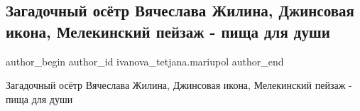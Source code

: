  
 
 
 
 

\subsection{Загадочный осётр Вячеслава Жилина,  Джинсовая икона, Мелекинский пейзаж - пища для души}
\label{sec:21_02_2021.fb.ivanova_tetjana.mariupol.1.zagadochnii_osyotr_v}

\ifcmt
 author_begin
   author_id ivanova_tetjana.mariupol
 author_end
\fi

Загадочный осётр Вячеслава Жилина, Джинсовая икона, Мелекинский пейзаж - пища для души
